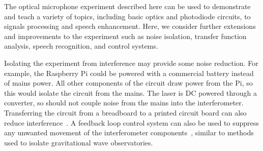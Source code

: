 \documentclass[paper-main.tex]{subfiles}
\begin{document}
The optical microphone experiment described here can be used to demonstrate and teach a variety of topics, including basic optics and photodiode circuits, to signals processing and speech enhancement. Here, we consider further extensions and improvements to the experiment such as noise isolation, transfer function analysis, speech recognition, and control systems.


Isolating the experiment from interference may provide some noise reduction. 
For example, the Raspberry Pi could be powered with a commercial battery instead of mains power. 
All other components of the circuit draw power from the Pi, so this would isolate the circuit from the mains. 
The laser is DC powered through a converter, so should not couple noise from the mains into the interferometer. 
Transferring the circuit from a breadboard to a printed circuit board can also reduce interference~\cite{elfekey2013design}.
A feedback loop control system can also be used to suppress any unwanted movement of the interferometer components~\citep{abbott2017exploring, Sekiguchi:2016bmv, verhoeven2009robust}, similar to methods used to isolate gravitational wave observatories. 
\end{document}
